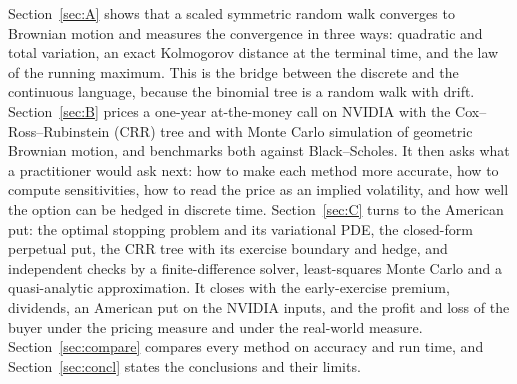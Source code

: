 Section~\ref{sec:A} shows that a scaled symmetric random walk converges to Brownian motion and measures the convergence in three ways: quadratic and total variation, an exact Kolmogorov distance at the terminal time, and the law of the running maximum.
This is the bridge between the discrete and the continuous language, because the binomial tree is a random walk with drift.
Section~\ref{sec:B} prices a one-year at-the-money call on NVIDIA with the Cox--Ross--Rubinstein (CRR) tree and with Monte Carlo simulation of geometric Brownian motion, and benchmarks both against Black--Scholes.
It then asks what a practitioner would ask next: how to make each method more accurate, how to compute sensitivities, how to read the price as an implied volatility, and how well the option can be hedged in discrete time.
Section~\ref{sec:C} turns to the American put: the optimal stopping problem and its variational PDE, the closed-form perpetual put, the CRR tree with its exercise boundary and hedge, and independent checks by a finite-difference solver, least-squares Monte Carlo and a quasi-analytic approximation.
It closes with the early-exercise premium, dividends, an American put on the NVIDIA inputs, and the profit and loss of the buyer under the pricing measure and under the real-world measure.
Section~\ref{sec:compare} compares every method on accuracy and run time, and Section~\ref{sec:concl} states the conclusions and their limits.
